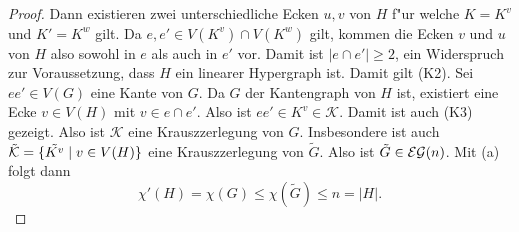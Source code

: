 \begin{proof}
  Dann existieren zwei unterschiedliche Ecken $u,v$ von $H$ f"ur welche $K= K^{v}$ und $K' = K^{w}$ gilt. 
  Da $e,e'\in V(K^{v}) \cap V(K^{w})$ gilt, kommen die Ecken $v$ und $u$ von $H$ also sowohl in $e$ als auch in $e'$ vor. Damit ist $|e\cap e'| \geq 2$, ein Widerspruch zur Voraussetzung, dass $H$ ein linearer Hypergraph ist. Damit gilt (K2).
  Sei $ee'\in V(G)$ eine Kante von $G$. Da $G$ der Kantengraph von $H$ ist, existiert eine Ecke $v\in V(H)$ mit $ v\in e\cap e'$. 
  Also ist $ee'\in K^{v}\in \mathcal{K}$. Damit ist auch (K3) gezeigt. Also ist $\mathcal{K}$ eine Krauszzerlegung von $G$. Insbesondere ist auch $\tilde{\mathcal{K}} = \{\tilde{K^{v}} \;|\; v\in V(H) \}$ eine Krauszzerlegung von $\tilde{G}$. Also ist $\tilde{G}\in {\cal EG}(n)$. Mit (a) folgt dann $$ \chi'(H) = \chi(G) \leq \chi(\tilde{G}) \leq n = |H|.$$


\end{proof}
